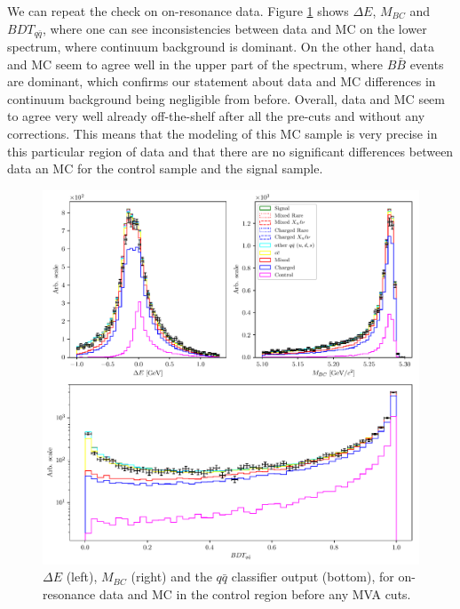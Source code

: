 \documentclass[oneside,a4paper,openany,12pt]{scrbook}
\begin{document}

We can repeat the check on on-resonance data. Figure \ref{fig:onres_control} shows $\Delta E$, $M_{BC}$ and $BDT_{q \bar q}$, where one can see inconsistencies between data and MC on the lower spectrum, where continuum background is dominant. On the other hand, data and MC seem to agree well in the upper part of the spectrum, where $B \bar B$ events are dominant, which confirms our statement about data and MC differences in continuum background being negligible from before. Overall, data and MC seem to agree very well already off-the-shelf after all the pre-cuts and without any corrections. This means that the modeling of this MC sample is very precise in this particular region of data and that there are no significant differences between data an MC for the control sample and the signal sample.

\begin{figure}[H]
\centering
\captionsetup{width=0.8\linewidth}
\includegraphics[width=\linewidth]{fig/onres_control}
\caption{$\Delta E$ (left), $M_{BC}$ (right) and the $q \bar q$ classifier output (bottom), for on-resonance data and MC in the control region before any MVA cuts.}
\label{fig:onres_control}
\end{figure}
\end{document}
